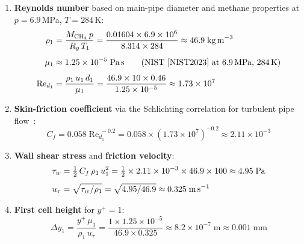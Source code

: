 \documentclass[12pt,a4paper]{report}
\begin{document}
\begin{enumerate}
  \item \textbf{Reynolds number} based on main-pipe diameter and
        methane properties at $p = 6.9$\,MPa, $T = 284$\,K:
  \begin{align}
    \rho_1 &= \frac{M_{\mathrm{CH_4}}\, p}{R_g\, T_1}
            = \frac{0.01604 \times 6.9 \times 10^6}{8.314 \times 284}
            \approx 46.9\;\text{kg\,m}^{-3}
    \label{eq:rho1} \\[4pt]
    \mu_1  &\approx 1.25 \times 10^{-5}\;\text{Pa\,s}
            \qquad\text{(NIST~\cite{NIST2023} at 6.9\,MPa, 284\,K)}
    \label{eq:mu1} \\[4pt]
    \mathrm{Re}_{d_1}
           &= \frac{\rho_1\, u_1\, d_1}{\mu_1}
            = \frac{46.9 \times 10 \times 0.46}{1.25 \times 10^{-5}}
            \approx 1.73 \times 10^{7}
    \label{eq:Re}
  \end{align}

  \item \textbf{Skin-friction coefficient} via the Schlichting
        correlation for turbulent pipe flow~\cite{Schlichting2017}:
  \begin{equation}
    C_f = 0.058\;\mathrm{Re}_{d_1}^{\;-0.2}
        = 0.058 \times (1.73 \times 10^7)^{-0.2}
        \approx 2.11 \times 10^{-3}
    \label{eq:Cf}
  \end{equation}

  \item \textbf{Wall shear stress} and \textbf{friction velocity}:
  \begin{align}
    \tau_w &= \tfrac{1}{2}\, C_f\, \rho_1\, u_1^2
            = \tfrac{1}{2} \times 2.11 \times 10^{-3} \times 46.9 \times 100
            \approx 4.95\;\text{Pa}
    \label{eq:tauw} \\[4pt]
    u_\tau &= \sqrt{\tau_w / \rho_1}
            = \sqrt{4.95 / 46.9}
            \approx 0.325\;\text{m\,s}^{-1}
    \label{eq:utau}
  \end{align}

  \item \textbf{First cell height} for $y^+ = 1$:
  \begin{equation}
    \Delta y_1 = \frac{y^+\, \mu_1}{\rho_1\, u_\tau}
               = \frac{1 \times 1.25 \times 10^{-5}}{46.9 \times 0.325}
               \approx 8.2 \times 10^{-7}\;\text{m}
               \approx \boxed{0.001\;\text{mm}}
    \label{eq:dy1}
  \end{equation}
\end{enumerate}
\end{document}
